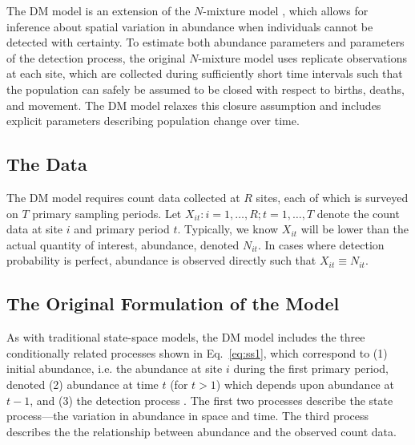 \documentclass[12pt]{article}
\begin{document}
The DM model is an extension of the $N$-mixture model
\citep{royle:2004biom}, which allows for inference about spatial
variation in abundance when individuals cannot be detected with
certainty. To estimate both abundance parameters and parameters
of the detection process, the original $N$-mixture model uses replicate
observations at each site, which are collected during sufficiently
short time intervals such that the population can safely be
assumed to be closed with respect to births, deaths, and movement. The DM
model relaxes this closure assumption and includes explicit parameters
describing population change over time.


\subsection{The Data}

The DM model requires count data collected at $R$ sites, each of
which is surveyed on $T$ primary sampling periods. 
Let $X_{it}: i=1,\hdots,R; t=1,\hdots,T$ denote the count data
at site $i$ and primary period $t$. 
Typically, we know $X_{it}$ will be lower than the
actual quantity of interest, abundance,
denoted $N_{it}$. In cases where detection probability is perfect,
abundance is observed directly such that $X_{it} \equiv N_{it}$.

\subsection{The Original Formulation of the Model}

As with traditional state-space models, the DM model includes the
three conditionally related processes shown in Eq.~\ref{eq:ss1},
which correspond to (1) initial abundance, i.e. the
abundance at site $i$ during the first primary period,
denoted (2) abundance at time $t$ (for $t>1$) which depends upon
abundance at $t-1$, and (3) the
detection process \citep{dail_madsen:2011}.
The first two processes describe the state process---the
variation in abundance in space and time. The third process %
describes the the relationship between
abundance and the observed count data.
\end{document}
